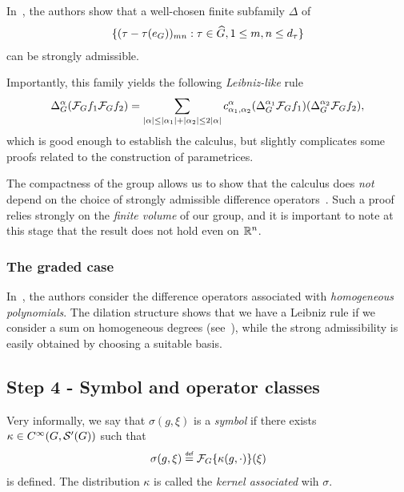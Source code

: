 In~\cite{RuzhanskyTurunenWirth10},
the authors show that a well-chosen finite subfamily $\Delta$ of
\begin{align*}
    \{(\tau - \tau(e_G))_{m n} : \tau \in {\widehat{G}}, 1 \leq m, n \leq {d_{\tau}}\}
\end{align*}
can be strongly admissible.

Importantly,
this family yields the following \emph{Leibniz-like} rule
\begin{align*}
    {\Delta_{G}^{\alpha}} (\mathcal{F}_{G} f_1 \mathcal{F}_{G} f_2)
    = \sum_{\left|{\alpha}\right| \leq \left|{\alpha_1}\right| + \left|{\alpha_2}\right| \leq 2 \left|{\alpha}\right|}
    c^\alpha_{\alpha_1, \alpha_2}
    ({\Delta_{G}^{\alpha_1}} \mathcal{F}_{G} f_1)
    ({\Delta_{G}^{\alpha_2}} \mathcal{F}_{G} f_2),
\end{align*}
which is good enough to establish the calculus,
but slightly complicates some proofs related to the construction of parametrices.

The compactness of the group allows us to show that the calculus does \emph{not} depend on the choice of strongly admissible difference operators~\cite{RuzhanskyTurunenWirth10,Fischer2015}.
Such a proof relies strongly on the \emph{finite volume} of our group,
and it is important to note at this stage that the result does not hold even on $\mathbb{R}^n$.

\subsubsection*{The graded case}

In~\cite{FischerRuzhansky16},
the authors consider the difference operators associated with \emph{homogeneous polynomials}.
The dilation structure
shows that we have a Leibniz rule if we consider a sum on homogeneous degrees
(see~\cite[Subsection 5.2.1]{FischerRuzhansky16}),
while the strong admissibility is easily obtained by choosing a suitable basis.

\subsection*{Step 4 - Symbol and operator classes}

Very informally,
we say that $\sigma(g, \xi)$ is a \emph{symbol} if there exists $\kappa \in {C^\infty(G, {\mathcal{S}' (G)})}$ such that
\begin{align*}
    \sigma(g, \xi) \defeq \Fourier \{\kappa(g, \dummy)\}(\xi)
\end{align*}
is defined.
The distribution $\kappa$ is called the \emph{kernel associated} wih $\sigma$.

